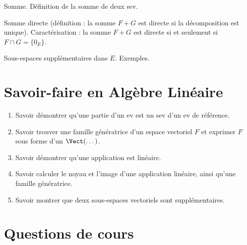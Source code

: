 \documentclass[a4paper,french,bookmarks]{article}
\begin{document}
\begin{enumerate}
    \ithand  Somme. Définition de la somme de deux sev.
    
    \ithand Somme directe (définition : la somme $F + G$ est directe si la décomposition est unique). Caractérisation : la somme $F + G$ est directe si et seulement si $F \cap G = \{0_E\}$.

    \ithand Sous-espaces supplémentaires dans $E$. Exemples.
\end{enumerate}

\section*{\centering\EBGaramond\Large Savoir-faire en Algèbre Linéaire}

\begin{enumerate}
    \item Savoir démontrer qu'une partie d'un ev est un sev d'un ev de référence.
    
    \item Savoir trouver une famille génératrice d'un espace vectoriel $F$ et exprimer $F$ sous forme d'un $\Vect(\dots)$.
    
    \item Savoir démontrer qu'une application est linéaire.
    
    \item Savoir calculer le noyau et l'image d'une application linéaire, ainsi qu'une famille génératrice.
    
    \item Savoir montrer que deux sous-espaces vectoriels sont supplémentaires.
\end{enumerate}

\section*{\centering\EBGaramond\Large Questions de cours}
\end{document}
